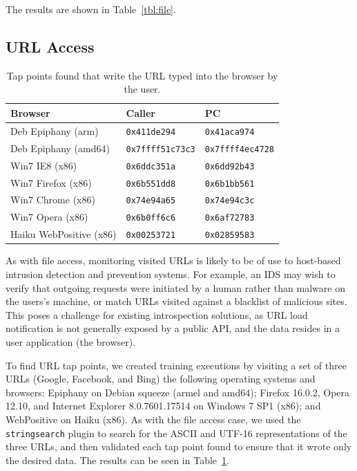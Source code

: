 The results are shown in Table~\ref{tbl:file}. 

\subsection{URL Access}
\label{sec:eval:subsec:url}

\begin{table}
    \centering
    \small
    \begin{tabular}{|l|l|l|}
        \hline
        Browser & Caller & PC \\
        \hline
        Deb Epiphany (arm) & \texttt{0x411de294} & \texttt{0x41aca974} \\
        Deb Epiphany (amd64) & \texttt{0x7ffff51c73c3} & \texttt{0x7ffff4ec4728} \\ 
        Win7 IE8 (x86) & \texttt{0x6ddc351a} & \texttt{0x6dd92b43} \\
        Win7 Firefox (x86) & \texttt{0x6b551dd8} & \texttt{0x6b1bb561} \\
        Win7 Chrome (x86) &  \texttt{0x74e94a65} & \texttt{0x74e94c3c} \\
        Win7 Opera (x86) &  \texttt{0x6b0ff6c6} & \texttt{0x6af72783} \\
        Haiku WebPositive (x86) & \texttt{0x00253721} & \texttt{0x02859583} \\
        \hline
    \end{tabular}
\caption{Tap points found that write the URL typed into the browser by
the user.}
\label{tbl:url}
\end{table}

As with file access, monitoring visited URLs is likely to be of use to
host-based intrusion detection and prevention systems. For example, an
IDS may wish to verify that outgoing requests were initiated by a human
rather than malware on the users's machine, or match URLs visited
against a blacklist of malicious sites. This poses a challenge for
existing introspection solutions, as URL load notification is not
generally exposed by a public API, and the data resides in a user
application (the browser).

To find URL tap points, we created training executions by visiting a set
of three URLs (Google, Facebook, and Bing) the following operating
systems and browsers: Epiphany on Debian squeeze (armel and amd64);
Firefox 16.0.2, Opera 12.10, and Internet Explorer 8.0.7601.17514 on
Windows 7 SP1 (x86); and WebPositive on Haiku (x86). As with the file
access case, we used the \texttt{stringsearch} plugin to search for the
ASCII and UTF-16 representations of the three URLs, and then validated
each tap point found to ensure that it wrote only the desired data. The
results can be seen in Table~\ref{tbl:url}.


